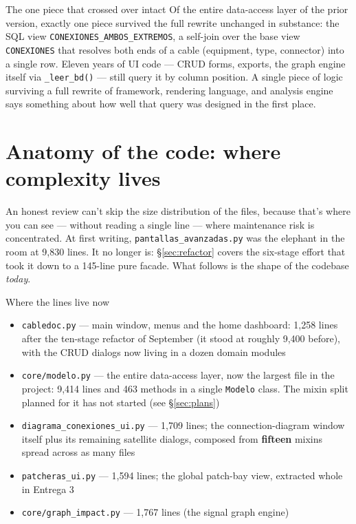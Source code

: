 \documentclass[10.4pt,twocolumn]{article}
\begin{document}
\begin{bugbox}{The one piece that crossed over intact}
Of the entire data-access layer of the prior version, exactly one piece survived the full rewrite unchanged in substance: the SQL view \texttt{CONEXIONES\_AMBOS\_EXTREMOS}, a self-join over the base view \texttt{CONEXIONES} that resolves both ends of a cable (equipment, type, connector) into a single row. Eleven years of UI code --- CRUD forms, exports, the graph engine itself via \texttt{\_leer\_bd()} --- still query it by column position. A single piece of logic surviving a full rewrite of framework, rendering language, and analysis engine says something about how well that query was designed in the first place.
\end{bugbox}

\section{Anatomy of the code: where complexity lives}
\label{sec:anatomy}

An honest review can't skip the size distribution of the files, because that's where you can see --- without reading a single line --- where maintenance risk is concentrated. At first writing, \texttt{pantallas\_avanzadas.py} was the elephant in the room at 9{,}830 lines. It no longer is: \S\ref{sec:refactor} covers the six-stage effort that took it down to a 145-line pure facade. What follows is the shape of the codebase \emph{today}.

\begin{specbox}{Where the lines live now}
\begin{itemize}[leftmargin=1.0em,itemsep=1pt,topsep=2pt]
\item \texttt{cabledoc.py} --- main window, menus and the home dashboard: 1{,}258 lines after the ten-stage refactor of September (it stood at roughly 9{,}400 before), with the CRUD dialogs now living in a dozen domain modules
\item \texttt{core/modelo.py} --- the entire data-access layer, now the largest file in the project: 9{,}414 lines and 463 methods in a single \texttt{Modelo} class. The mixin split planned for it has not started (see \S\ref{sec:plans})
\item \texttt{diagrama\_conexiones\_ui.py} --- 1{,}709 lines; the connection-diagram window itself plus its remaining satellite dialogs, composed from \textbf{fifteen} mixins spread across as many files
\item \texttt{patcheras\_ui.py} --- 1{,}594 lines; the global patch-bay view, extracted whole in Entrega 3
\item \texttt{core/graph\_impact.py} --- 1{,}767 lines (the signal graph engine)
\end{itemize}
\end{specbox}
\end{document}
